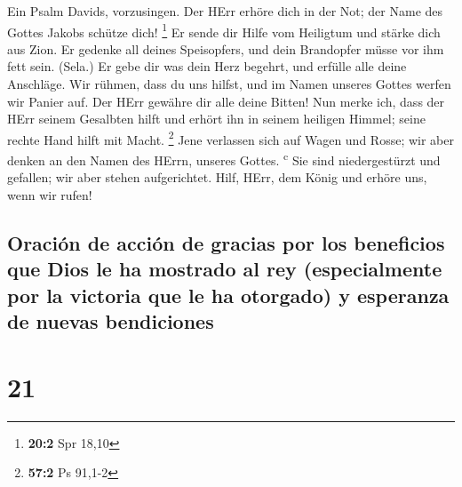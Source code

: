 Ein Psalm Davids, vorzusingen.  Der HErr
erhöre dich in der Not; der Name des Gottes Jakobs schütze dich!
\footnote{\textbf{20:2} Spr 18,10}  Er sende dir Hilfe vom
Heiligtum und stärke dich aus Zion.  Er gedenke all deines
Speisopfers, und dein Brandopfer müsse vor ihm fett sein. (Sela.)
 Er gebe dir was dein Herz begehrt, und erfülle alle deine
Anschläge.  Wir rühmen, dass du uns hilfst, und im Namen
unseres Gottes werfen wir Panier auf. Der HErr gewähre dir alle deine
Bitten!  Nun merke ich, dass der HErr seinem Gesalbten
hilft und erhört ihn in seinem heiligen Himmel; seine rechte Hand hilft
mit Macht. \footnote{\textbf{57:2} Ps 91,1-2}  Jene
verlassen sich auf Wagen und Rosse; wir aber denken an den Namen des
HErrn, unseres Gottes. \textsuperscript{c}  Sie sind
niedergestürzt und gefallen; wir aber stehen aufgerichtet.
 Hilf, HErr, dem König und erhöre uns, wenn wir rufen!

\hypertarget{oraciuxf3n-de-acciuxf3n-de-gracias-por-los-beneficios-que-dios-le-ha-mostrado-al-rey-especialmente-por-la-victoria-que-le-ha-otorgado-y-esperanza-de-nuevas-bendiciones}{%
\subsection{Oración de acción de gracias por los beneficios que Dios le
ha mostrado al rey (especialmente por la victoria que le ha otorgado) y
esperanza de nuevas
bendiciones}\label{oraciuxf3n-de-acciuxf3n-de-gracias-por-los-beneficios-que-dios-le-ha-mostrado-al-rey-especialmente-por-la-victoria-que-le-ha-otorgado-y-esperanza-de-nuevas-bendiciones}}

\hypertarget{section-20}{%
\section{21}\label{section-20}}

